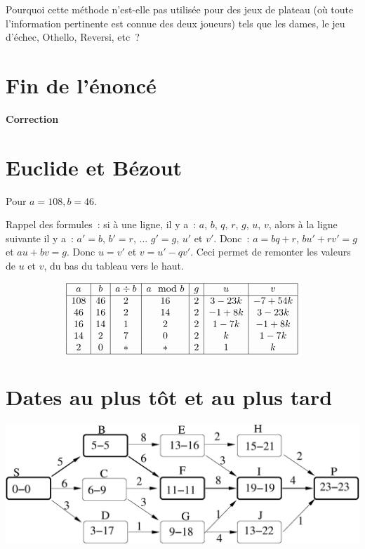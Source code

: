 \documentclass[11pt]{article}
\begin{document}
Pourquoi cette méthode n'est-elle pas utilisée pour des jeux de plateau (où toute l'information pertinente est connue des deux joueurs) tels que les dames, le jeu d'échec, Othello, Reversi, etc~? 

\section*{Fin de l'énoncé}
\newpage

 
\newpage

{\bf\LARGE Correction}
\maketitle
\section{Euclide et Bézout}

Pour $a=108, b=46$.

Rappel des formules~: si à une ligne, il y a~: $a$, $b$, $q$, $r$, $g$, $u$, $v$, alors à la ligne suivante il y a~: $a'=b$, $b'=r$, ... $g'=g$, $u'$ et $v'$.
Donc~:  $a=bq+r$, $bu'+rv'=g$ et $au+bv=g$. Donc
$u=v'$ et $v=u'-qv'$.
Ceci permet de remonter les valeurs de $u$ et $v$, du bas du tableau vers le haut.

$$\begin{array}{|c|c|c|c|c|c|c|}
\hline
a & b & a\div b & a\mod b & g &u & v \\
\hline
108 & 46 & 2 & 16 & 2 & 3-23k & -7+54k \\
46 & 16  & 2 & 14 & 2 & -1+8k & 3-23k  \\
16 & 14  & 1 & 2  & 2 & 1-7k  & -1+8k  \\
14  & 2  & 7 & 0  & 2 & k     & 1-7k  \\
2  & 0   & * & *  & 2 & 1     & k  \\
\hline
\end{array}
$$

\section{Dates au plus tôt et au plus tard}
\begin{center}
\includegraphics[width=0.95\linewidth]{critic_solution.eps}
\end{center}
\end{document}
